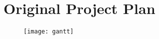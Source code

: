 \newpage
\appendix
\appendixpage
\addappheadtotoc

\section{Original Project Plan} \label{appx:plan}

\begin{figure}[htbp]
   \centerline{
   \texttt{[image: gantt]}}
\end{figure}

